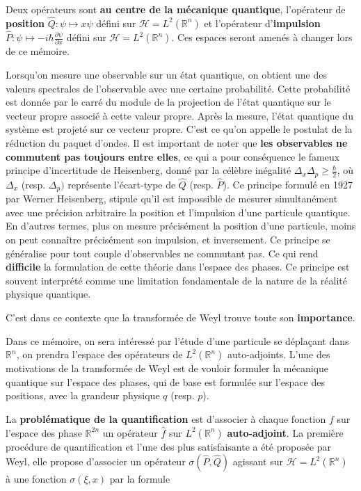 \documentclass[a4paper, 12pt]{report}
\newcommand{\R}{\mathbb{R}} %
\renewcommand{\.}{\cdot} %
\theoremstyle{break}
\theoremstyle{remark}
\theoremstyle{proofstyle}
\begin{document}
Deux opérateurs sont \textbf{au centre de la mécanique quantique}, l'opérateur de \textbf{position} $\hat{Q} : \psi \mapsto x \psi$ défini sur $\mathcal{H}=L^2(\R^n)$ et l'opérateur d'\textbf{impulsion} $\hat{P} : \psi \mapsto -i \hbar \frac{\partial \psi}{\partial x}$ défini sur $\mathcal{H}=L^2(\R^n)$. Ces espaces seront amenés à changer lors de ce mémoire.\vspace{7 pt}


Lorsqu'on mesure une observable sur un état quantique, on obtient une des valeurs spectrales de l'observable avec une certaine probabilité. Cette probabilité est donnée par le carré du module de la projection de l'état quantique sur le vecteur propre associé à cette valeur propre. Après la mesure, l'état quantique du système est projeté sur ce vecteur propre. C'est ce qu'on appelle le postulat de la réduction du paquet d'ondes. Il est important de noter que \textbf{les observables ne commutent pas toujours entre elles}, ce qui a pour conséquence le fameux principe d'incertitude de Heisenberg, donné par la célèbre inégalité $\Delta_x \Delta_p \geq \frac{\hbar}{2}$, où $\Delta_x$ (resp. $\Delta_p)$ représente l'écart-type de $\hat{Q}$ (resp. $\hat{P}$). Ce principe formulé en 1927 par Werner Heisenberg, stipule qu'il est impossible de mesurer simultanément avec une précision arbitraire la position et l'impulsion d'une particule quantique. En d'autres termes, plus on mesure précisément la position d'une particule, moins on peut connaître précisément son impulsion, et inversement. Ce principe se généralise pour tout couple d'observables ne commutant pas. Ce qui rend \textbf{difficile} la formulation de cette théorie dans l'espace des phases. Ce principe est souvent interprété comme une limitation fondamentale de la nature de la réalité physique quantique. \vspace{7 pt}

C'est dans ce contexte que la transformée de Weyl trouve toute son \textbf{importance}. \vspace{7 pt}

Dans ce mémoire, on sera intéressé par l'étude d'une particule se déplaçant dans $\mathbb{R}^n$, on prendra l'espace des opérateurs de $L^2(\R^n)$ auto-adjoints. L'une des motivations de la transformée de Weyl est de vouloir formuler la mécanique quantique sur l'espace des phases, qui de base est formulée sur l'espace des positions, avec la grandeur physique $q$ (resp. $p$). \vspace{7 pt}

La \textbf{problématique de la quantification} est d'associer à chaque fonction $f$ sur l'espace des phase $\R^{2n}$ un opérateur $\hat{f}$ sur $L^2(\mathbb{R}^n)$ \textbf{auto-adjoint}. La première procédure de quantification et l'une des plus satisfaisante a été proposée par Weyl, elle propose d'associer un opérateur $\sigma(\hat{P},\hat{Q})$ agissant sur $\mathcal{H} = L^2(\R^n)$ à une fonction $\sigma(\xi, x)$ par la formule
\end{document}
